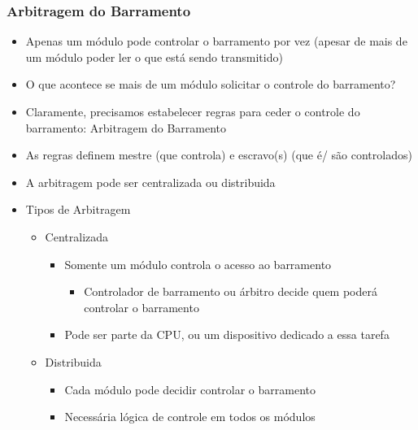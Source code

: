 \documentclass[12pt]{article}
\begin{document}
        \subsubsection{Arbitragem do Barramento}
        \begin{itemize}
            \item Apenas um módulo pode controlar o barramento por vez (apesar 
            de mais de um módulo poder ler o que está sendo transmitido)
            \item O que acontece se mais de um módulo solicitar o controle do 
            barramento?
            \item Claramente, precisamos estabelecer regras para ceder o 
            controle do barramento: Arbitragem do Barramento 
            \item As regras definem mestre (que controla) e escravo(s) (que é/
            são controlados)
            \item A arbitragem pode ser centralizada ou distribuida
            \item Tipos de Arbitragem
            \begin{itemize}
                \item Centralizada
                \begin{itemize}
                    \item Somente um módulo controla o acesso ao barramento
                    \begin{itemize}
                        \item Controlador de barramento ou árbitro decide quem 
                        poderá controlar o barramento
                    \end{itemize}
                    \item Pode ser parte da CPU, ou um dispositivo dedicado a 
                    essa tarefa
                \end{itemize}
                \item Distribuida
                \begin{itemize}
                    \item Cada módulo pode decidir controlar o barramento
                    \item Necessária lógica de controle em todos os módulos
                \end{itemize}
            \end{itemize}
        \end{itemize}
\end{document}
